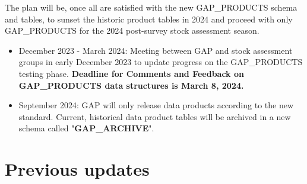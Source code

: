 \documentclass[
  letterpaper,
  oneside,
  open=any]{scrbook}
\begin{document}
The plan will be, once all are satisfied with the new GAP\_PRODUCTS
schema and tables, to sunset the historic product tables in 2024 and
proceed with only GAP\_PRODUCTS for the 2024 post-survey stock
assessment season.

\begin{itemize}
\item
  December 2023 - March 2024: Meeting between GAP and stock assessment
  groups in early December 2023 to update progress on the GAP\_PRODUCTS
  testing phase. \textbf{Deadline for Comments and Feedback on
  GAP\_PRODUCTS data structures is March 8, 2024.}
\item
  September 2024: GAP will only release data products according to the
  new standard. Current, historical data product tables will be archived
  in a new schema called "\textbf{GAP\_ARCHIVE}".
\end{itemize}

\hypertarget{previous-updates}{%
\section{Previous updates}\label{previous-updates}}
\end{document}
